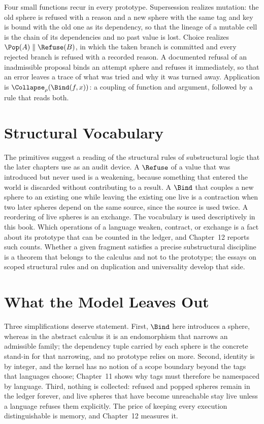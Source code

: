 Four small functions recur in every prototype. Supersession realizes mutation: the old sphere is refused with a reason and a new sphere with the same tag and key is bound with the old one as its dependency, so that the lineage of a mutable cell is the chain of its dependencies and no past value is lost. Choice realizes $\Pop(A)\parallel\Refuse(B)$, in which the taken branch is committed and every rejected branch is refused with a recorded reason. A documented refusal of an inadmissible proposal binds an attempt sphere and refuses it immediately, so that an error leaves a trace of what was tried and why it was turned away. Application is $\Collapse_\rho(\Bind(f,x))$: a coupling of function and argument, followed by a rule that reads both.


\section{Structural Vocabulary}

The primitives suggest a reading of the structural rules of substructural logic that the later chapters use as an audit device. A $\Refuse$ of a value that was introduced but never used is a weakening, because something that entered the world is discarded without contributing to a result. A $\Bind$ that couples a new sphere to an existing one while leaving the existing one live is a contraction when two later spheres depend on the same source, since the source is used twice. A reordering of live spheres is an exchange. The vocabulary is used descriptively in this book. Which operations of a language weaken, contract, or exchange is a fact about its prototype that can be counted in the ledger, and Chapter~12 reports such counts. Whether a given fragment satisfies a precise substructural discipline is a theorem that belongs to the calculus and not to the prototype; the essays on scoped structural rules and on duplication and universality \cite{flyxion-scoped,flyxion-duplication} develop that side.

\section{What the Model Leaves Out}

Three simplifications deserve statement. First, $\Bind$ here introduces a sphere, whereas in the abstract calculus it is an endomorphism that narrows an admissible family; the dependency tuple carried by each sphere is the concrete stand-in for that narrowing, and no prototype relies on more. Second, identity is by integer, and the kernel has no notion of a scope boundary beyond the tags that languages choose; Chapter~11 shows why tags must therefore be namespaced by language. Third, nothing is collected: refused and popped spheres remain in the ledger forever, and live spheres that have become unreachable stay live unless a language refuses them explicitly. The price of keeping every execution distinguishable is memory, and Chapter~12 measures it.

